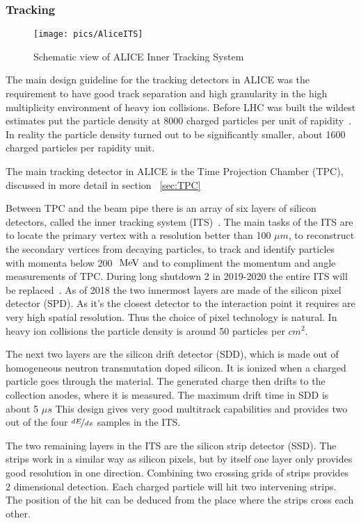 \subsubsection{Tracking}
\begin{figure}[htb]
\centering
\texttt{[image: pics/AliceITS]}
\caption[ITS]{Schematic view of ALICE Inner Tracking System}
\label{fig:its}
\end{figure}


The main design guideline for the tracking detectors in ALICE was the requirement to have good track separation and high granularity in the high multiplicity environment of heavy ion collisions. Before LHC was built the wildest estimates put the particle density at 8000 charged particles per unit of rapidity~\cite{}. In reality the particle density turned out to be significantly smaller, about 1600 charged particles per rapidity unit.~\cite{}

The main tracking detector in ALICE is the Time Projection Chamber (TPC), discussed in more detail in section ~\ref{sec:TPC}

Between TPC and the beam pipe there is an array of six layers of silicon detectors, called the inner tracking system (ITS)~\cite{ITS}. The main tasks of the ITS are to locate the primary vertex with a resolution better than 100 $\mu m$, to reconstruct the secondary vertices from decaying particles, to track and identify particles with momenta below 200 $\mbox{~MeV}$ and to compliment the momentum and angle measurements of TPC. During long shutdown 2 in 2019-2020 the entire ITS will be replaced~\cite{ITSupgrage}. As of 2018 the two innermost layers are made of the silicon pixel detector (SPD). As it's the closest detector to the interaction point it requires are very high spatial resolution. Thus the choice of pixel technology is natural. In heavy ion collisions the particle density is around 50 particles per $cm^2$. 

The next two layers are the silicon drift detector (SDD), which is made out of homogeneous neutron transmutation doped silicon. It is ionized when a charged particle goes through the material. The generated charge then drifts to the collection anodes, where it is measured. The maximum drift time in SDD is about 5 $\mu s$ This design gives very good multitrack capabilities and provides two out of the four $\nicefrac{dE}{dx}$ samples in the ITS.

The two remaining layers in the ITS are the silicon strip detector (SSD). The strips work in a similar way as silicon pixels, but by itself one layer only provides good resolution in one direction. Combining two crossing grids of strips provides 2 dimensional detection. Each charged particle will hit two intervening strips. The position of the hit can be deduced from the place where the strips cross each other.


